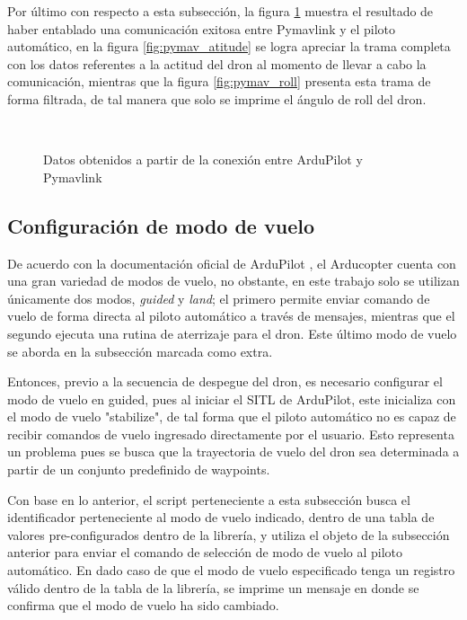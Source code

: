 Por último con respecto a esta subsección, la figura \ref{fig:pymav_listen} muestra el resultado de haber entablado una comunicación exitosa entre Pymavlink y el piloto automático, en la figura \ref{fig:pymav_atitude} se logra apreciar la trama completa con los datos referentes a la actitud del dron al momento de llevar a cabo la comunicación, mientras que la figura \ref{fig:pymav_roll} presenta esta trama de forma filtrada, de tal manera que solo se imprime el ángulo de roll del dron.
 

\begin{figure}[ht]
    \centering
    \\
    \caption{Datos obtenidos a partir de la conexión entre ArduPilot y Pymavlink} 
    \label{fig:pymav_listen}
\end{figure}


\subsection{Configuración de modo de vuelo}

De acuerdo con la documentación oficial de ArduPilot \cite{Ardu_modes}, el Arducopter cuenta con una gran variedad de modos de vuelo, no obstante, en este trabajo solo se utilizan únicamente dos modos, \textit{guided} y \textit{land}; el primero permite enviar comando de vuelo de forma directa al piloto automático a través de mensajes, mientras que el segundo ejecuta una rutina de aterrizaje para el dron. Este último modo de vuelo se aborda en la subsección marcada como extra.

Entonces, previo a la secuencia de despegue del dron, es necesario configurar el modo de vuelo en guided, pues al iniciar el SITL de ArduPilot, este inicializa con el modo de vuelo "stabilize", de tal forma que el piloto automático no es capaz de recibir comandos de vuelo ingresado directamente por el usuario. Esto representa un problema pues se busca que la trayectoria de vuelo del dron sea determinada a partir de un conjunto predefinido de waypoints.

Con base en lo anterior, el script perteneciente a esta subsección busca el identificador perteneciente al modo de vuelo indicado, dentro de una tabla de valores pre-configurados dentro de la librería, y utiliza el objeto de la subsección anterior para enviar el comando de selección de modo de vuelo al piloto automático. En dado caso de que el modo de vuelo especificado tenga un registro válido dentro de la tabla de la librería, se imprime un mensaje en donde se confirma que el modo de vuelo ha sido cambiado.

